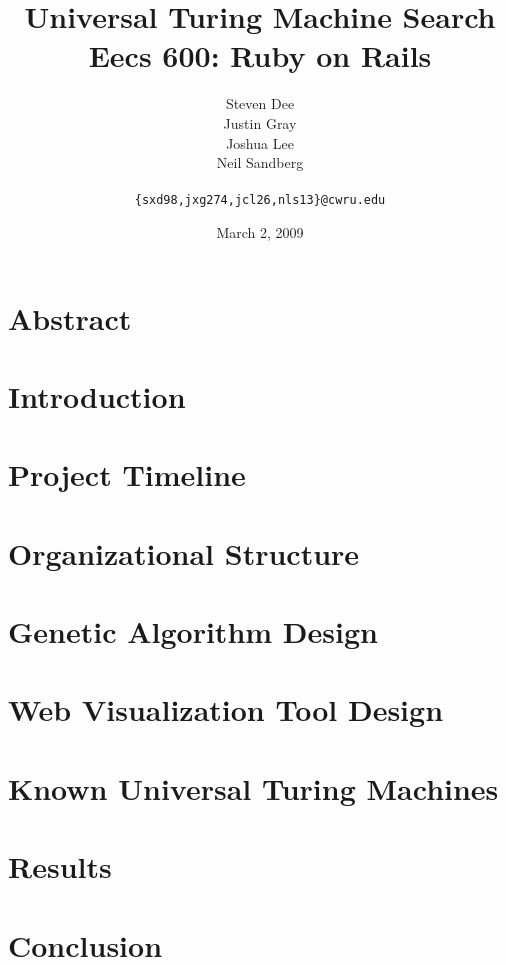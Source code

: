 \documentclass{article}
\title{Universal Turing Machine Search\\
\Large {\sc Eecs} 600: Ruby on Rails}
\author{Steven Dee \\
Justin Gray \\
Joshua Lee \\
Neil Sandberg \\
 \\
\tt \{sxd98,jxg274,jcl26,nls13\}@cwru.edu}
\date{March 2, 2009}
\begin{document}
\maketitle

\section{Abstract}


\section{Introduction}


\section{Project Timeline}


\section{Organizational Structure}


\section{Genetic Algorithm Design}


\section{Web Visualization Tool Design}


\section{Known Universal Turing Machines}


\section{Results}


\section {Conclusion}




\end{document}
